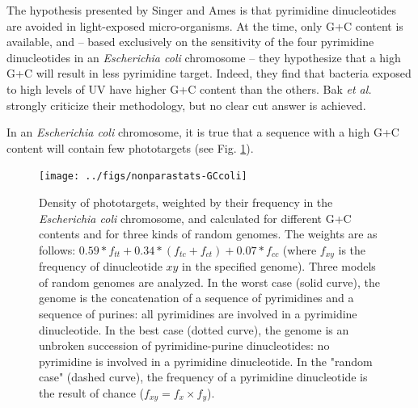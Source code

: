 \documentclass{article}
\begin{document}

The hypothesis presented by Singer and Ames \cite{Singer} is that
pyrimidine dinucleotides are avoided in light-exposed micro-organisms.
At the time, only G+C content is available, and -- based exclusively
on the sensitivity of the four pyrimidine dinucleotides in an
\textit{Escherichia coli} chromosome -- they hypothesize that a high
G+C will result in less pyrimidine target. Indeed, they find that
bacteria exposed to high levels of UV have higher G+C content than the
others. Bak \textit{et al.} \cite{Bak} strongly criticize their
methodology, but no clear cut answer is achieved.

In an \textit{Escherichia coli} chromosome, it is true that a sequence
with a high G+C content will contain few phototargets (see Fig.
\ref{GCcoli}).

\begin{figure}[H]
  \begin{center}
\texttt{[image: ../figs/nonparastats-GCcoli]}
\end{center}
\caption{Density of phototargets, weighted by their frequency in the
  \textit{Escherichia coli} chromosome, and calculated for different
  G+C contents and for three kinds of random genomes. The weights are
  as follows: $0.59*f_{tt}+0.34*(f_{tc}+f_{ct})+0.07*f_{cc}$ (where
  $f_{xy}$ is the frequency of dinucleotide $xy$ in the specified
  genome). Three models of random genomes are analyzed. In the worst
  case (solid curve), the genome is the concatenation of a sequence of
  pyrimidines and a sequence of purines: all pyrimidines are involved
  in a pyrimidine dinucleotide. In the best case (dotted curve), the
  genome is an unbroken succession of pyrimidine-purine dinucleotides:
  no pyrimidine is involved in a pyrimidine dinucleotide. In the
  "random case" (dashed curve), the frequency of a pyrimidine
  dinucleotide is the result of chance ($f_{xy} = f_{x}\times
  f_{y}$).}
\label{GCcoli}
\end{figure}
\end{document}
